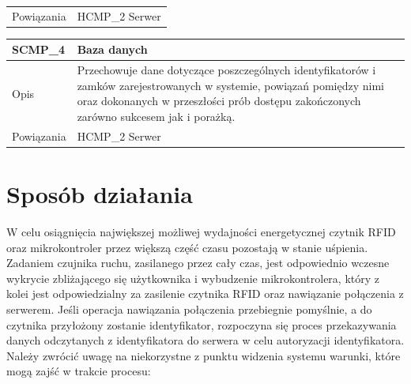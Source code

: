 \begin{table}
\begin{subtable}[c]{\textwidth}
\begin{tabular}{p{2cm}|p{12cm}}
                            \hline Powiązania   & HCMP\_2 Serwer    \\
                        \end{tabular}
                        \label{tbl:scmp3}
                        \vspace{10mm}           
                    \end{subtable}                 
                \quad%
                    \begin{subtable}[c]{\textwidth}
                        \centering
                        \begin{tabular}{p{2cm}|p{12cm}}
                            SCMP\_4      & \textbf{Baza danych} \\
                            \hline Opis         & Przechowuje dane dotyczące poszczególnych identyfikatorów i zamków zarejestrowanych w systemie, powiązań pomiędzy nimi oraz dokonanych w przeszłości prób dostępu zakończonych zarówno sukcesem jak i porażką. \\
                            \hline Powiązania   & HCMP\_2 Serwer    \\
                            \end{tabular}
                        \label{tbl:scmp4}     
                    \end{subtable} 
                    \label{tbl:sw_comp}
                \end{table}

        \pagebreak


        \pagebreak

        \section{Sposób działania}
            W celu osiągnięcia największej możliwej wydajności energetycznej czytnik RFID oraz mikrokontroler przez większą część czasu pozostają w stanie uśpienia. Zadaniem czujnika ruchu, zasilanego przez cały czas, jest odpowiednio wczesne wykrycie zbliżającego się użytkownika i wybudzenie mikrokontrolera, który z kolei jest odpowiedzialny za zasilenie czytnika RFID oraz nawiązanie połączenia z serwerem. Jeśli operacja nawiązania połączenia przebiegnie pomyślnie, a do czytnika przyłożony zostanie identyfikator, rozpoczyna się proces przekazywania danych odczytanych z identyfikatora do serwera w celu autoryzacji identyfikatora. Należy zwrócić uwagę na niekorzystne z punktu widzenia systemu warunki, które mogą zajść w trakcie procesu:

